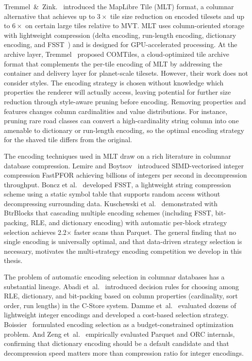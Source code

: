 Tremmel~\&~Zink.~\cite{tremmelMapLibreTileNext2025b} introduced the MapLibre Tile (MLT) format, a columnar alternative that achieves up to $3\times$ tile size reduction on encoded tilesets and up to $6\times$ on certain large tiles relative to \ac{MVT}.
\ac{MLT} uses column-oriented storage with lightweight compression (delta encoding, run-length encoding, dictionary encoding, and \ac{FSST}~\cite{bonczFSSTFastRandom2020}) and is designed for \ac{GPU}-accelerated processing.
At the archive layer, Tremmel~\cite{tremmelCOMTILESCASESTUDY2023} proposed COMTiles, a cloud-optimized tile archive format that complements the per-tile encoding of \ac{MLT} by addressing the container and delivery layer for planet-scale tilesets.
However, their work does not consider styles.
The encoding strategy is chosen without knowledge which properties the renderer will actually access, leaving potential for further size reduction through style-aware pruning before encoding.
Removing properties and features changes column cardinalities and value distributions.
For instance, pruning rare road classes can convert a high-cardinality string column into one amenable to dictionary or run-length encoding, so the optimal encoding strategy for the shaved tile differs from the original.

The encoding techniques used in \ac{MLT} draw on a rich literature in columnar database compression.
Lemire and Boytsov~\cite{lemireDecodingBillionsIntegers2015} introduced \ac{SIMD}-vectorised integer compression \ac{FastPFOR} achieving billions of integers per second in decompression throughput.
Boncz et al.~\cite{bonczFSSTFastRandom2020} developed \ac{FSST}, a lightweight string compression scheme using a static symbol table that supports random access without decompressing surrounding data.
Kuschewski et al.~\cite{kuschewskiBtrBlocksEfficientColumnar2023} demonstrated with BtrBlocks that cascading multiple encoding schemes (including \ac{FSST}, bit-packing, \ac{RLE}, and dictionary encoding) with automatic per-block strategy selection achieves 2.2$\times$ faster scans than Parquet.
The general finding that no single encoding is universally optimal, and that data-driven strategy selection is necessary, motivates the multi-strategy encoding competition we develop in this thesis.

The problem of automatic encoding selection in columnar databases has a substantial lineage.
Abadi et~al.~\cite{abadiIntegratingCompressionExecution2006} introduced decision rules for choosing among \ac{RLE}, dictionary, and bit-packing based on column properties (cardinality, sort order, run lengths) in the C-Store system.
Damme et~al.~\cite{dammeComprehensiveExperimentalSurvey2019} evaluated dozens of lightweight integer encodings and developed a cost-based selection strategy.
Boissier~\cite{ganBaguaScalingDistributed2021} formulated encoding selection as a budget-constrained optimization problem.
And Zeng et~al.~\cite{zengEmpiricalEvaluationColumnar2023} empirically evaluated Parquet and ORC internals, confirming that dictionary encoding should be a default candidate and that decompression speed matters more than compression ratio for integer encodings.

